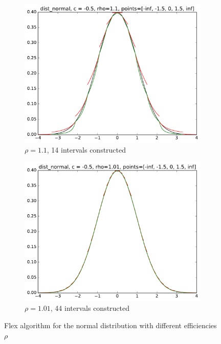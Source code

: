 \begin{figure}
\begin{subfigure}[b]{0.49\textwidth}
        \includegraphics[width=\textwidth]{figs/tf_example_normal_14.pdf}
        \caption{$\rho = 1.1$, 14 intervals constructed}
    \end{subfigure}
    \begin{subfigure}[b]{0.49\textwidth}
        \includegraphics[width=\textwidth]{figs/tf_example_normal_44.pdf}
        \caption{$\rho = 1.01$, 44 intervals constructed}
    \end{subfigure}
    \caption{Flex algorithm for the normal distribution with different efficiencies $\rho$}
     \label{fig:tf_example_normal}
\end{figure}

